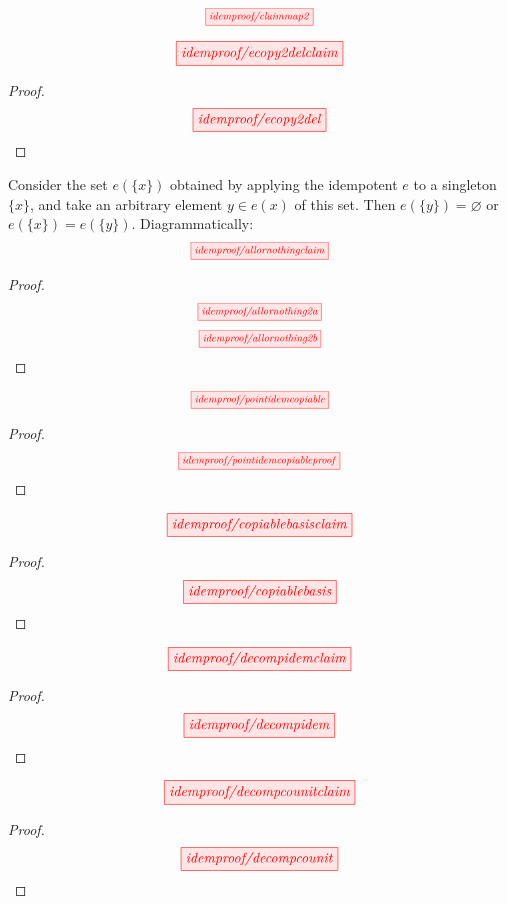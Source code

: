 \begin{fullwidth}
\[\scalebox{0.75}{\tikzfig{idemproof/claimmap2}}\]

\begin{proposition}\label{prop:counitdelete}
\[\scalebox{1}{\tikzfig{idemproof/ecopy2delclaim}}\]
\begin{proof}
\[\scalebox{1}{\tikzfig{idemproof/ecopy2del}}\]
\end{proof}
\end{proposition}

\newpage
\begin{lemma}\label{lem:allornothing}
Consider the set $e(\{x\})$ obtained by applying the idempotent $e$ to a singleton $\{x\}$, and take an arbitrary element $y \in e(x)$ of this set. Then $e(\{y\}) = \varnothing$ or $e(\{x\}) = e(\{y\})$. Diagrammatically: \[\scalebox{0.75}{\tikzfig{idemproof/allornothingclaim}}\]
\begin{proof}
\[\scalebox{0.75}{\tikzfig{idemproof/allornothing2a}}\]
\[\scalebox{0.75}{\tikzfig{idemproof/allornothing2b}}\]
\end{proof}
\end{lemma}

\begin{proposition}\label{prop:epointcopy}
\[\scalebox{0.75}{\tikzfig{idemproof/pointidemcopiable}}\]
\begin{proof}
\[\scalebox{0.75}{\tikzfig{idemproof/pointidemcopiableproof}}\]
\end{proof}
\end{proposition}

\begin{proposition}\label{prop:copiablebasis}
\[\scalebox{1}{\tikzfig{idemproof/copiablebasisclaim}}\]
\begin{proof}
\[\scalebox{1}{\tikzfig{idemproof/copiablebasis}}\]
\end{proof}
\end{proposition}

\begin{proposition}\label{prop:decompidem}
\[\scalebox{1}{\tikzfig{idemproof/decompidemclaim}}\]
\begin{proof}
\[\scalebox{1}{\tikzfig{idemproof/decompidem}}\]
\end{proof}
\end{proposition}

\begin{proposition}\label{prop:decompcounit}
\[\scalebox{1}{\tikzfig{idemproof/decompcounitclaim}}\]
\begin{proof}
\[\scalebox{1}{\tikzfig{idemproof/decompcounit}}\]
\end{proof}
\end{proposition}


\end{fullwidth}

